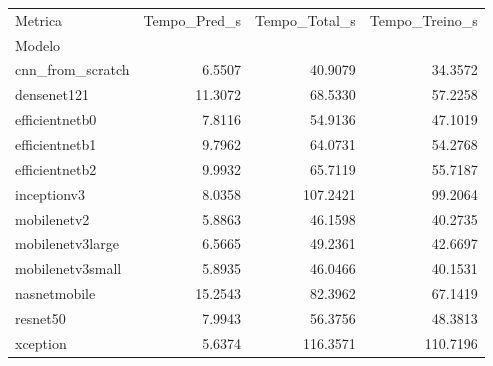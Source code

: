 \begin{tabular}{lrrr}
\toprule
Metrica & Tempo_Pred_s & Tempo_Total_s & Tempo_Treino_s \\
Modelo &  &  &  \\
\midrule
cnn_from_scratch & 6.5507 & 40.9079 & 34.3572 \\
densenet121 & 11.3072 & 68.5330 & 57.2258 \\
efficientnetb0 & 7.8116 & 54.9136 & 47.1019 \\
efficientnetb1 & 9.7962 & 64.0731 & 54.2768 \\
efficientnetb2 & 9.9932 & 65.7119 & 55.7187 \\
inceptionv3 & 8.0358 & 107.2421 & 99.2064 \\
mobilenetv2 & 5.8863 & 46.1598 & 40.2735 \\
mobilenetv3large & 6.5665 & 49.2361 & 42.6697 \\
mobilenetv3small & 5.8935 & 46.0466 & 40.1531 \\
nasnetmobile & 15.2543 & 82.3962 & 67.1419 \\
resnet50 & 7.9943 & 56.3756 & 48.3813 \\
xception & 5.6374 & 116.3571 & 110.7196 \\
\bottomrule
\end{tabular}
